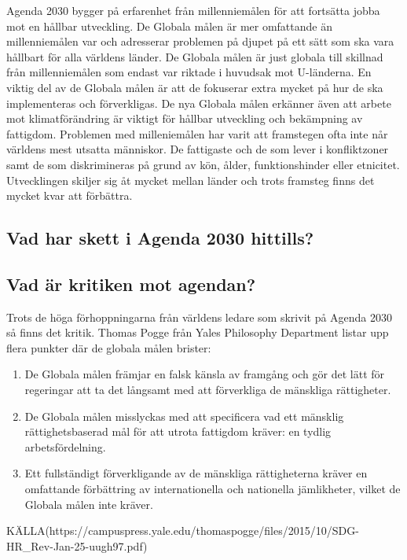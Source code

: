 \documentclass{report}
\begin{document}
Agenda 2030 bygger på erfarenhet från millenniemålen för att fortsätta jobba mot en hållbar utveckling. \cite{webEuropeanComission}
De Globala målen är mer omfattande än millenniemålen var och adresserar problemen på djupet på ett sätt som ska vara hållbart för alla världens länder. De Globala målen är just globala till skillnad från millenniemålen som endast var riktade i huvudsak mot U-länderna. En viktig del av de Globala målen är att de fokuserar extra mycket på hur de ska implementeras och förverkligas. De nya Globala målen erkänner även att arbete mot klimatförändring är viktigt för hållbar utveckling och bekämpning av fattigdom. \cite{web2030agenda}
Problemen med milleniemålen har varit att framstegen ofta inte når världens mest utsatta människor. De fattigaste och de som lever i konfliktzoner samt de som diskrimineras på grund av kön, ålder, funktionshinder eller etnicitet. Utvecklingen skiljer sig åt mycket mellan länder och trots framsteg finns det  mycket kvar att förbättra. \\

\subsection{Vad har skett i Agenda 2030 hittills?}

\subsection{Vad är kritiken mot agendan?} 
Trots de höga förhoppningarna från världens ledare som skrivit på Agenda 2030 så finns det kritik. Thomas Pogge \cite{critique} från Yales Philosophy Department listar upp flera punkter där de globala målen brister: 

\begin{enumerate}
\item De Globala målen främjar en falsk känsla av framgång och gör det lätt för regeringar att ta det långsamt med att förverkliga de mänskliga rättigheter. 
\item De Globala målen misslyckas med att specificera vad ett mänsklig rättighetsbaserad mål för att utrota fattigdom kräver: en tydlig arbetsfördelning. 
\item Ett fullständigt förverkligande av de mänskliga rättigheterna kräver en omfattande förbättring av internationella och nationella jämlikheter, vilket de Globala målen inte kräver. 
\end{enumerate} 

KÄLLA(https://campuspress.yale.edu/thomaspogge/files/2015/10/SDG-HR_Rev-Jan-25-uugh97.pdf)\\
\end{document}
